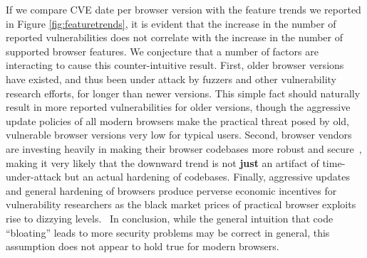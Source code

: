 If we compare CVE date per browser version with the feature trends we
reported in Figure \ref{fig:featuretrends}, it is evident that the
increase in the number of reported vulnerabilities does not correlate
with the increase in the number of supported browser features.  We
conjecture that a number of factors are interacting to cause this
counter-intuitive result.  First, older browser versions have existed,
and thus been under attack by fuzzers and other vulnerability research
efforts, for longer than newer versions. This simple fact should
naturally result in more reported vulnerabilities for older versions,
though the aggressive update policies of all modern browsers make the
practical threat posed by old, vulnerable browser versions very low for
typical users.  Second, browser vendors are investing heavily in making
their browser codebases more robust and
secure~\cite{FirefoxCrashes,ChromeSecure}, making it very likely that
the downward trend is not \textbf{just} an artifact of time-under-attack
but an actual hardening of codebases.  Finally, aggressive updates and
general hardening of browsers produce perverse economic incentives for
vulnerability researchers as the black market prices of practical
browser exploits rise to dizzying
levels.~\cite{TODO-recent-exploit-pricing} In conclusion, while the
general intuition that code ``bloating'' leads to more security problems
may be correct in general, this assumption does not appear to hold true
for modern browsers.

